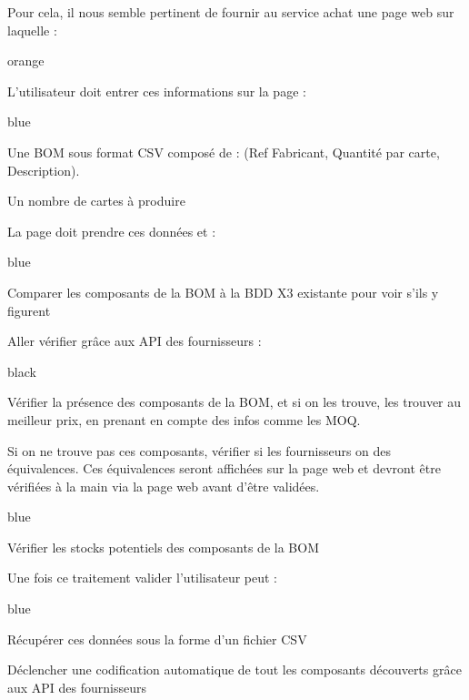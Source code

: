 Pour cela, il nous semble pertinent de fournir au service achat une page web sur laquelle :


\begin{items}{orange}{\Bullet}
\item L’utilisateur doit entrer ces informations sur la page :
\begin{items}{blue}{\Triangle}
\item Une BOM sous format CSV composé de : (Ref Fabricant, Quantité par carte, Description).
\item Un nombre de cartes à produire
\end{items}

\item La page doit prendre ces données et :
\begin{items}{blue}{\Triangle}
\item Comparer les composants de la BOM à la BDD X3 existante pour voir s’ils y figurent
\item Aller vérifier grâce aux API des fournisseurs :
\begin{items}{black}{\Triangle}
\item Vérifier la présence des composants de la BOM, et si on les trouve, les trouver au meilleur prix, en prenant en compte des infos comme les MOQ.
\item Si on ne trouve pas ces composants, vérifier si les fournisseurs on des équivalences. Ces équivalences seront affichées sur la page web et devront être vérifiées à la main via la page web avant d’être validées.
\end{items}
\end{items}
\begin{items}{blue}{\Triangle}
\item Vérifier les stocks potentiels des composants de la BOM
\end{items}
\item Une fois ce traitement valider l’utilisateur peut :
\begin{items}{blue}{\Triangle}
\item Récupérer ces données sous la forme d’un fichier CSV
\item Déclencher une codification automatique de tout les composants découverts grâce aux API des fournisseurs
\end{items}
\end{items}

